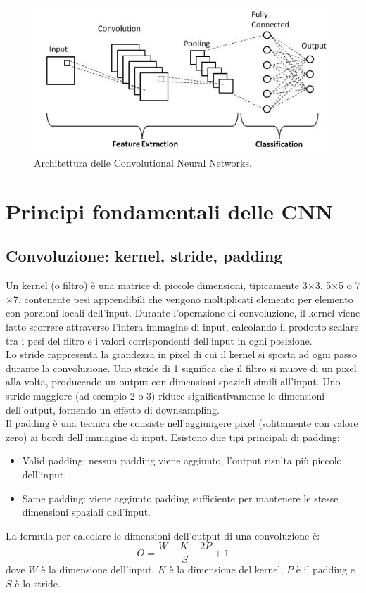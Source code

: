 \documentclass[a4paper,12pt]{report}
\begin{document}
	\begin{figure}[H]
		\centering
		\includegraphics[width=1.0\textwidth]{img/cnn.jpg}
		\caption{Architettura delle Convolutional Neural Networks.}
	\end{figure}
	
	\section{Principi fondamentali delle CNN}
	
	\subsection{Convoluzione: kernel, stride, padding}
	Un kernel (o filtro) è una matrice di piccole dimensioni, tipicamente 3$\times$3, 5$\times$5 o 7$\times$7, contenente pesi apprendibili che vengono moltiplicati elemento per elemento con porzioni locali dell'input. Durante l'operazione di convoluzione, il kernel viene fatto scorrere attraverso l'intera immagine di input, calcolando il prodotto scalare tra i pesi del filtro e i valori corrispondenti dell'input in ogni posizione. \\
	Lo stride rappresenta la grandezza in pixel di cui il kernel si sposta ad ogni passo durante la convoluzione. Uno stride di 1 significa che il filtro si muove di un pixel alla volta, producendo un output con dimensioni spaziali simili all'input. Uno stride maggiore (ad esempio 2 o 3) riduce significativamente le dimensioni dell'output, fornendo un effetto di downsampling. \\
	Il padding è una tecnica che consiste nell'aggiungere pixel (solitamente con valore zero) ai bordi dell'immagine di input. Esistono due tipi principali di padding:
	\begin{itemize}
		\item Valid padding: nessun padding viene aggiunto, l'output risulta più piccolo dell'input.
		\item Same padding: viene aggiunto padding sufficiente per mantenere le stesse dimensioni spaziali dell'input.
	\end{itemize}
	La formula per calcolare le dimensioni dell'output di una convoluzione è:
	$$O = \frac{W - K + 2P}{S} + 1$$
	dove $W$ è la dimensione dell'input, $K$ è la dimensione del kernel, $P$ è il padding e $S$ è lo stride.
	
\end{document}
